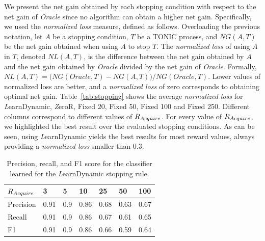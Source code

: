 \documentclass[journal]{IEEEtran}
\newcommand{\learnFixed}{{\textit ZeroR}}
\newcommand{\learnDynamic}{{\textit LearnDynamic}}
\newcommand{\Acquire}{{\textit Acquire}}
\begin{document}
We present the net gain obtained by each stopping condition with respect to the net gain of \emph{Oracle} since no algorithm can obtain a higher net gain. Specifically, we used the \emph{normalized loss} measure, defined as follows. Overloading the previous notation, let $A$ be a stopping condition, $T$ be a TONIC process, and $NG(A,T)$ be the net gain obtained when using $A$ to stop $T$. 
The \emph{normalized loss} of using $A$ in $T$, denoted $NL(A,T)$, is the 
difference between the net gain obtained by $A$ and the net gain obtained by \emph{Oracle} divided by the net gain of \textit{Oracle}. Formally, 
$NL(A,T)=\big(NG(\textit{Oracle},T)-NG(A,T)\big)/NG(\textit{Oracle},T)$. 
Lower values of normalized loss are better, and a \emph{normalized loss} of zero corresponds to obtaining optimal net gain. 
Table~\ref{tab:stopping} shows the average \emph{normalized loss} for \learnDynamic, \learnFixed, Fixed 20, Fixed 50, Fixed 100 and Fixed 250. 
Different columns correspond to different values of $R_{\Acquire{}}$. 
For every value of $R_{\Acquire{}}$, we highlighted the best result over the evaluated stopping conditions. 
As can be seen, using \learnDynamic{} yields the best results for most reward values, always providing a \emph{normalized loss} smaller than 0.3. 

\begin{table}
\centering
\begin{tabular}{|l|l|l|l|l|l|l|}
\hline
$R_{\Acquire{}}$    & 3    & 5   & 10   & 25   & 50   & 100  \\ \hline
Precision & 0.91 & 0.9 & 0.86 & 0.68 & 0.63 & 0.67 \\ 
Recall    & 0.91 & 0.9 & 0.86 & 0.67 & 0.61 & 0.65 \\ 
F1        & 0.91 & 0.9 & 0.86 & 0.66 & 0.59 & 0.64 \\ \hline
\end{tabular}
\caption{Precision, recall, and F1 score for the classifier learned for the \learnDynamic{} stopping rule.}
\label{tab:stopping-classifier}
\end{table}
\end{document}

